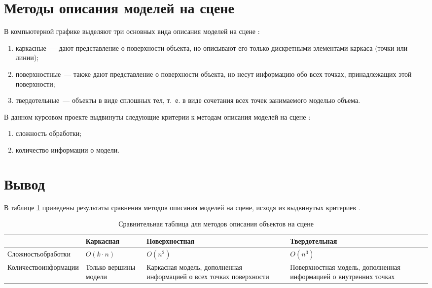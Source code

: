 \section{Методы описания моделей на сцене}

В компьютерной графике выделяют три основных вида описания моделей на сцене \cite{models}:
\begin{enumerate}
	\item каркасные~--- дают представление о поверхности объекта, но описывают его только дискретными элементами каркаса (точки или линии);
	\item поверхностные~--- также дают представление о поверхности объекта, но несут информацию обо всех точках, принадлежащих этой поверхности;
	\item твердотельные~--- объекты в виде сплошных тел, т.~е. в виде сочетания всех точек занимаемого моделью объема.
\end{enumerate}

В данном курсовом проекте выдвинуты следующие критерии к методам описания моделей на сцене \cite{compareModels1}:
\begin{enumerate}
	\item сложность обработки;
	\item количество информации о модели.
\end{enumerate}

\section*{Вывод}

В таблице \ref{table:compareModels} приведены результаты сравнения методов описания моделей на сцене, исходя из выдвинутых критериев \cite{compareModels2}.
\begin{table}[h!]
	\begin{center}
		\caption{\label{table:compareModels} Сравнительная таблица для методов описания объектов на сцене}
		\begin{tabular}{|p{100pt}|p{100pt}|p{120pt}|p{120pt}|}
			\hline
			~ & Каркасная & Поверхностная & Твердотельная \\ \hline
			Сложность\newline обработки & $O(k \cdot n)$ & $O(n^2)$ & $O(n^3)$ \\ \hline
			Количество\newline информации & Только вершины модели & Каркасная модель, дополненная информацией о всех точках поверхности & Поверхностная модель, дополненная информацией о внутренних точках \\ \hline
		\end{tabular}
	\end{center}
\end{table}

